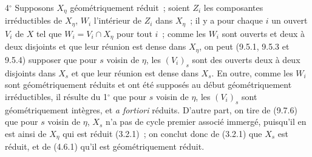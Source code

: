 4$^\circ$ Supposons $X_\eta$ géométriquement réduit~; soient $Z_i$ les
composantes irréductibles de $X_\eta$, $W_i$ l'intérieur de $Z_i$ dans
$X_\eta$~; il y a pour chaque $i$ un ouvert $V_i$ de $X$ tel que
$W_i=V_i\cap X_\eta$ pour tout $i$~; comme les $W_i$ sont ouverts et deux à deux
disjoints et que leur réunion est dense dans $X_\eta$, on peut (9.5.1, 9.5.3 et
9.5.4) supposer que pour $s$ voisin de $\eta$, les $(V_i)_s$ sont des ouverts
deux à deux disjoints dans $X_s$ et que leur réunion est dense dans $X_s$. En
outre, comme les $W_i$ sont géométriquement réduits et ont été supposés au
début géométriquement irréductibles, il résulte du 1$^\circ$ que pour $s$ voisin
de $\eta$, les $(V_i)_s$ sont géométriquement intègres, et \emph{a fortiori}
réduits. D'autre part, on tire de (9.7.6) que pour $s$ voisin de $\eta$, $X_s$
n'a pas de cycle premier associé immergé, puisqu'il en est ainsi de $X_\eta$
qui est réduit (3.2.1)~; on conclut donc de (3.2.1) que $X_s$ est réduit, et de
(4.6.1) qu'il est géométriquement réduit.

